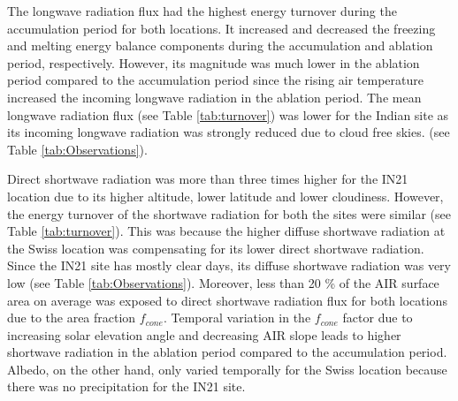 \documentclass[utf8]{frontiersSCNS}
\begin{document}
The longwave radiation flux had the highest energy turnover during the accumulation period for both
locations. It increased and decreased the freezing and melting energy balance components during the accumulation
and ablation period, respectively. However, its magnitude was much lower in the ablation period compared to the
accumulation period since the rising air temperature increased the incoming longwave radiation in the ablation
period. The mean longwave radiation flux (see Table \ref{tab:turnover}) was lower for the Indian site as its incoming longwave
radiation was strongly reduced due to cloud free skies. (see Table \ref{tab:Observations}).

Direct shortwave radiation was more than three times higher for the IN21 location due to its higher altitude,
lower latitude and lower cloudiness. However, the energy turnover of the shortwave radiation for both the sites
were similar (see Table \ref{tab:turnover}). This was because the higher diffuse shortwave radiation at the
Swiss location was compensating for its lower direct shortwave radiation. Since the IN21 site has mostly clear
days, its diffuse shortwave radiation was very low (see Table \ref{tab:Observations}). Moreover, less than 20 \%
of the AIR surface area on average was exposed to direct shortwave radiation flux for both locations due to
the area fraction $f_{cone}$. Temporal variation in the $f_{cone}$ factor due to increasing solar elevation
angle and decreasing AIR slope leads to higher shortwave radiation in the ablation period compared to the
accumulation period. Albedo, on the other hand, only varied temporally for the Swiss location because there was
no precipitation for the IN21 site.
\end{document}
